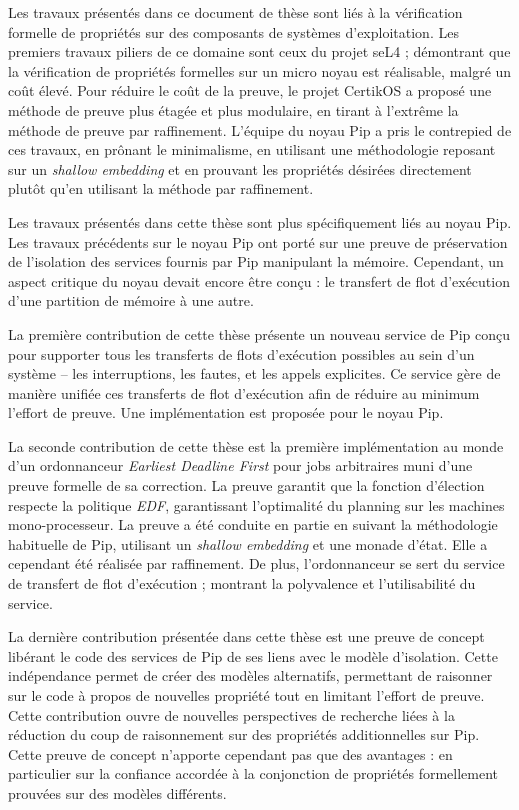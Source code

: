 
\vfil

Les travaux présentés dans ce document de thèse sont liés à la vérification formelle de propriétés sur des composants de systèmes d'exploitation. Les premiers travaux piliers de ce domaine sont ceux du projet seL4 ; démontrant que la vérification de propriétés formelles sur un micro noyau est réalisable, malgré un coût élevé. Pour réduire le coût de la preuve, le projet CertikOS a proposé une méthode de preuve plus étagée et plus modulaire, en tirant à l'extrême la méthode de preuve par raffinement. L'équipe du noyau Pip a pris le contrepied de ces travaux, en prônant le minimalisme, en utilisant une méthodologie reposant sur un \emph{shallow embedding} et en prouvant les propriétés désirées directement plutôt qu'en utilisant la méthode par raffinement.

Les travaux présentés dans cette thèse sont plus spécifiquement liés au noyau Pip. Les travaux précédents sur le noyau Pip ont porté sur une preuve de préservation de l'isolation des services fournis par Pip manipulant la mémoire. Cependant, un aspect critique du noyau devait encore être conçu : le transfert de flot d'exécution d'une partition de mémoire à une autre.

La première contribution de cette thèse présente un nouveau service de Pip conçu pour supporter tous les transferts de flots d'exécution possibles au sein d'un système -- les interruptions, les fautes, et les appels explicites. Ce service gère de manière unifiée ces transferts de flot d'exécution afin de réduire au minimum l'effort de preuve. Une implémentation est proposée pour le noyau Pip.

La seconde contribution de cette thèse est la première implémentation au monde d'un ordonnanceur \emph{Earliest Deadline First} pour jobs arbitraires muni d'une preuve formelle de sa correction. La preuve garantit que la fonction d'élection respecte la politique \emph{EDF}, garantissant l'optimalité du planning sur les machines mono-processeur. La preuve a été conduite en partie en suivant la méthodologie habituelle de Pip, utilisant un \emph{shallow embedding} et une monade d'état. Elle a cependant été réalisée par raffinement. De plus, l'ordonnanceur se sert du service de transfert de flot d'exécution ; montrant la polyvalence et l'utilisabilité du service.

La dernière contribution présentée dans cette thèse est une preuve de concept libérant le code des services de Pip de ses liens avec le modèle d'isolation. Cette indépendance permet de créer des modèles alternatifs, permettant de raisonner sur le code à propos de nouvelles propriété tout en limitant l'effort de preuve. Cette contribution ouvre de nouvelles perspectives de recherche liées à la réduction du coup de raisonnement sur des propriétés additionnelles sur Pip. Cette preuve de concept n'apporte cependant pas que des avantages : en particulier sur la confiance accordée à la conjonction de propriétés formellement prouvées sur des modèles différents.

\vfil
